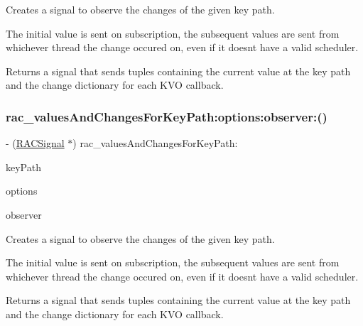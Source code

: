 Creates a signal to observe the changes of the given key path.

The initial value is sent on subscription, the subsequent values are sent from whichever thread the change occured on, even if it doesn\textquotesingle{}t have a valid scheduler.

Returns a signal that sends tuples containing the current value at the key path and the change dictionary for each K\+VO callback. \mbox{\label{category_n_s_object_07_r_a_c_property_subscribing_08_a0cfc29dcd9e667013645d785d194fd7e}} 
\subsubsection{\texorpdfstring{rac\+\_\+values\+And\+Changes\+For\+Key\+Path\+:options\+:observer\+:()}{rac\_valuesAndChangesForKeyPath:options:observer:()}\hspace{0.1cm}{\footnotesize\ttfamily [3/3]}}
{\footnotesize\ttfamily -\/ (\mbox{\hyperlink{interface_r_a_c_signal}{R\+A\+C\+Signal}} $\ast$) rac\+\_\+values\+And\+Changes\+For\+Key\+Path\+: \begin{DoxyParamCaption}\item[{(N\+S\+String $\ast$)}]{key\+Path }\item[{options:(N\+S\+Key\+Value\+Observing\+Options)}]{options }\item[{observer:(\+\_\+\+\_\+weak N\+S\+Object $\ast$)}]{observer }\end{DoxyParamCaption}}

Creates a signal to observe the changes of the given key path.

The initial value is sent on subscription, the subsequent values are sent from whichever thread the change occured on, even if it doesn\textquotesingle{}t have a valid scheduler.

Returns a signal that sends tuples containing the current value at the key path and the change dictionary for each K\+VO callback. \mbox{\label{category_n_s_object_07_r_a_c_property_subscribing_08_aa2bf4263a7bab7e6d3223687806cfa4e}} 
